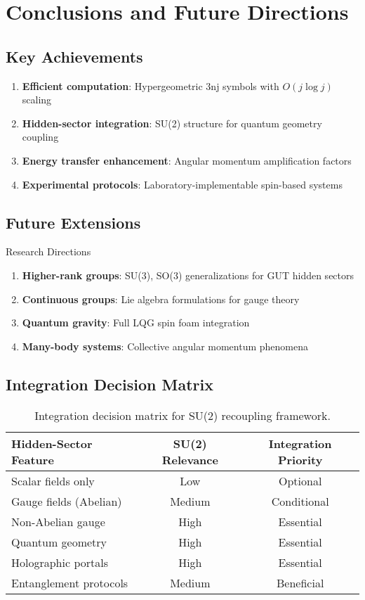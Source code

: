 \documentclass[12pt]{article}
\begin{document}
\section{Conclusions and Future Directions}

\subsection{Key Achievements}

\begin{enumerate}
\item \textbf{Efficient computation}: Hypergeometric 3nj symbols with $O(j \log j)$ scaling
\item \textbf{Hidden-sector integration}: SU(2) structure for quantum geometry coupling
\item \textbf{Energy transfer enhancement}: Angular momentum amplification factors
\item \textbf{Experimental protocols}: Laboratory-implementable spin-based systems
\end{enumerate}

\subsection{Future Extensions}

\begin{resultbox}{Research Directions}
\begin{enumerate}
\item \textbf{Higher-rank groups}: SU(3), SO(3) generalizations for GUT hidden sectors
\item \textbf{Continuous groups}: Lie algebra formulations for gauge theory
\item \textbf{Quantum gravity}: Full LQG spin foam integration
\item \textbf{Many-body systems}: Collective angular momentum phenomena
\end{enumerate}
\end{resultbox}

\subsection{Integration Decision Matrix}

\begin{table}[h]
\centering
\begin{tabular}{lcc}
\toprule
Hidden-Sector Feature & SU(2) Relevance & Integration Priority \\
\midrule
Scalar fields only & Low & Optional \\
Gauge fields (Abelian) & Medium & Conditional \\
Non-Abelian gauge & High & Essential \\
Quantum geometry & High & Essential \\
Holographic portals & High & Essential \\
Entanglement protocols & Medium & Beneficial \\
\bottomrule
\end{tabular}
\caption{Integration decision matrix for SU(2) recoupling framework.}
\end{table}
\end{document}
